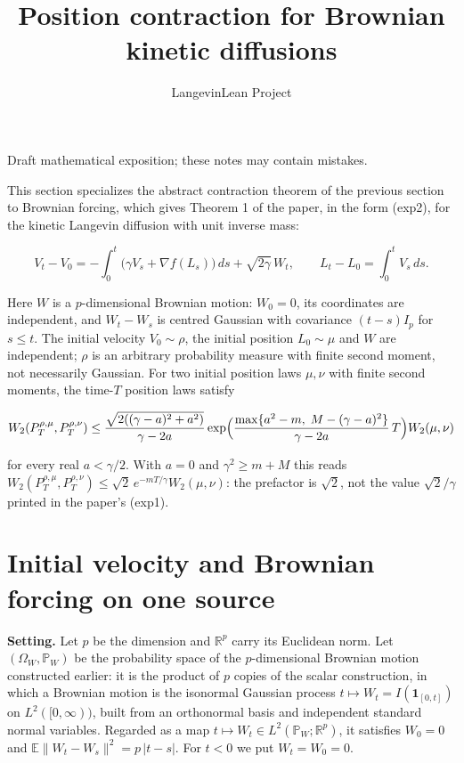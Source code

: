 \documentclass[11pt,a4paper]{article}
\title{\texorpdfstring{Position contraction for Brownian kinetic diffusions}{Position contraction for Brownian kinetic diffusions}}
\author{LangevinLean Project}
\date{}
\begin{document}
\maketitle
Draft mathematical exposition; these notes may contain mistakes.


This section specializes the abstract contraction theorem of the previous section to Brownian forcing, which gives Theorem 1 of the paper, in the form (exp2), for the kinetic Langevin diffusion with unit inverse mass:


\[V_t-V_0=-\int_0^t\bigl(\gamma V_s+\nabla f(L_s)\bigr)\,ds+\sqrt{2\gamma}\,W_t,\qquad L_t-L_0=\int_0^tV_s\,ds.\]


Here \(W\) is a \(p\)-dimensional Brownian motion: \(W_0=0\), its coordinates are independent, and \(W_t-W_s\) is centred Gaussian with covariance \((t-s)I_p\) for \(s\le t\). The initial velocity \(V_0\sim\rho\), the initial position \(L_0\sim\mu\) and \(W\) are independent; \(\rho\) is an arbitrary probability measure with finite second moment, not necessarily Gaussian. For two initial position laws \(\mu,\nu\) with finite second moments, the time-\(T\) position laws satisfy


\[W_2(P^{\rho,\mu}_T,P^{\rho,\nu}_T)\le\frac{\sqrt{2((\gamma-a)^2+a^2)}}{\gamma-2a}\exp\Bigl(\frac{\max\{a^2-m,\;M-(\gamma-a)^2\}}{\gamma-2a}\,T\Bigr)W_2(\mu,\nu)\]


for every real \(a<\gamma/2\). With \(a=0\) and \(\gamma^2\ge m+M\) this reads \(W_2(P^{\rho,\mu}_T,P^{\rho,\nu}_T)\le\sqrt2\,e^{-mT/\gamma}W_2(\mu,\nu)\): the prefactor is \(\sqrt2\), not the value \(\sqrt2/\gamma\) printed in the paper's (exp1).


\section{\texorpdfstring{Initial velocity and Brownian forcing on one source}{Initial velocity and Brownian forcing on one source}}


\textbf{Setting.} Let \(p\) be the dimension and \(\mathbb R^p\) carry its Euclidean norm. Let \((\Omega_W,\mathbb P_W)\) be the probability space of the \(p\)-dimensional Brownian motion constructed earlier: it is the product of \(p\) copies of the scalar construction, in which a Brownian motion is the isonormal Gaussian process \(t\mapsto W_t=I(\mathbf 1_{[0,t]})\) on \(L^2([0,\infty))\), built from an orthonormal basis and independent standard normal variables. Regarded as a map \(t\mapsto W_t\in L^2(\mathbb P_W;\mathbb R^p)\), it satisfies \(W_0=0\) and \(\mathbb E\|W_t-W_s\|^2=p\,|t-s|\). For \(t<0\) we put \(W_t=W_0=0\).
\end{document}
